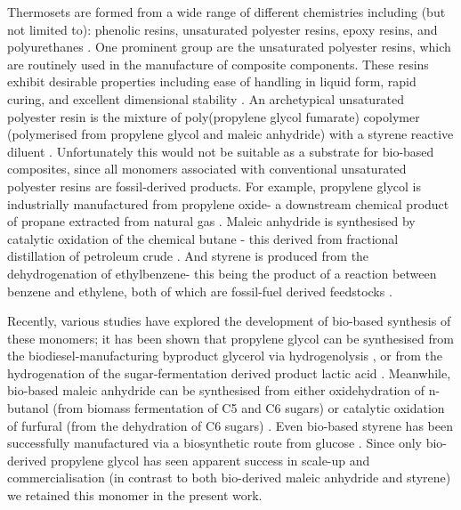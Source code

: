 Thermosets are formed from a wide range of different chemistries
 including (but not limited to): phenolic resins, unsaturated polyester
 resins, epoxy resins, and polyurethanes \autocite{Goodman1986}.
One prominent group are the unsaturated polyester resins, which are
 routinely used in the manufacture of composite components.
These resins exhibit desirable properties including ease of handling in
 liquid form, rapid curing, and excellent dimensional stability
 \autocite{Aziz2005,Lawrence1960}.
An archetypical unsaturated polyester resin is the mixture of 
 poly(propylene glycol fumarate) copolymer (polymerised 
 from propylene glycol and maleic anhydride) with a styrene reactive 
 diluent \autocite{Ahamad2001}.
Unfortunately this would not be suitable as a substrate for bio-based
 composites, since all monomers associated with conventional unsaturated
 polyester resins are fossil-derived products.
For example, propylene glycol is industrially manufactured from
 propylene oxide- a downstream chemical product of propane extracted
 from natural gas \autocite{Levi2018}.
Maleic anhydride is synthesised by catalytic oxidation
 of the chemical butane \autocite{Felthouse2001}- this derived from 
 fractional distillation of petroleum crude \autocite{Kissin1987}.
And styrene is produced from the dehydrogenation of 
 ethylbenzene- this being the product of a reaction between
 benzene and ethylene, both of which are fossil-fuel derived
 feedstocks \autocite{Lee2008,Levi2018}.

Recently, various studies have explored the development of bio-based
 synthesis of these monomers; it has been shown that propylene
 glycol can be synthesised from the biodiesel-manufacturing
 byproduct glycerol via hydrogenolysis
 \autocite{Dasari2005,Ricciardi2017}, or from the hydrogenation
 of the sugar-fermentation derived product lactic acid
 \autocite{Berlowska2015,Xiao2015}.
Meanwhile, bio-based maleic anhydride
 can be synthesised from either oxidehydration of n-butanol
 (from biomass fermentation of C5 and C6 sugars)
 \autocite{Pavarelli2015} or catalytic oxidation of furfural
 (from the dehydration of C6 sugars) \autocite{Li2016,Teong2014}.
Even bio-based styrene has been successfully manufactured
 via a biosynthetic route from glucose \autocite{McKenna2011}.
Since only bio-derived propylene glycol has seen apparent success in
 scale-up and commercialisation (in contrast to both bio-derived
 maleic anhydride and styrene) we retained this monomer
 in the present work.

